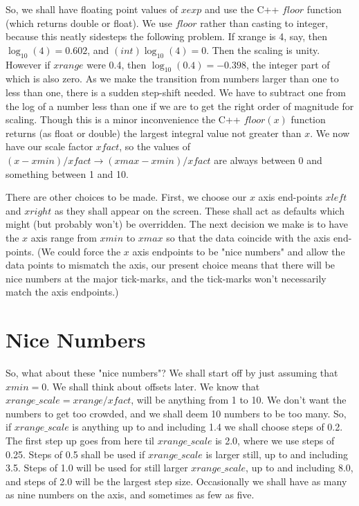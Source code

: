 \documentclass[12pt]{article}
\begin{document}
So, we shall have floating point values of $xexp$ and use the C++ $floor$
function (which returns double or float). We use $floor$ rather than casting 
to integer, because this neatly sidesteps the following
problem. If xrange is 4, say, then $\log_{10}(4)=0.602$,
and $(int)\log_{10}(4)=0$. Then  the scaling is unity. However if $xrange$ were
0.4, then $\log_{10}(0.4)=-0.398$, the integer part of which is also zero. As we
make the transition from numbers larger than one to less than one, there is a 
sudden step-shift needed. We have to subtract one from the log of a number
less than one if we are to get the
right order of magnitude for scaling. Though this is a minor inconvenience
 the C++ $floor(x)$ function returns (as float or double) the largest integral
value not greater than $x$. We now have our scale factor $xfact$, so
the values of $(x-xmin)/xfact \rightarrow (xmax-xmin)/xfact$
are always between 0 and something between 1 and 10.

There are other choices to be made. First, we choose our $x$ axis end-points
 $xleft$ and $xright$ as they shall appear on the screen. These shall
act as defaults which might (but probably won't) be overridden.
  The next decision we make is to have
the $x$ axis range from $xmin$ to $xmax$ so that the data coincide with the
axis end-points.  (We could force the $x$ axis endpoints to be "nice numbers"
 and allow the data points to mismatch the axis, our present choice means that
there will be nice numbers at the major tick-marks, and the tick-marks won't necessarily
match the axis endpoints.)

\section{Nice Numbers}

So, what about these "nice numbers"? We shall start off by just assuming that
$xmin=0$. We shall think about offsets later. We know that $xrange\_scale=xrange/xfact$, 
 will be anything from 1 to 10. We don't want the numbers to get too crowded, and
 we shall deem 10 numbers to be too many. So, if $xrange\_scale$ is anything
 up to and including 1.4
 we shall choose steps of 0.2. The first step up goes from here
 til $xrange\_scale$ is 2.0, where we use steps of 0.25.
 Steps of 0.5 shall be used if $xrange\_scale$ is larger still, up to and including
 3.5. Steps of 1.0 will be used for still larger $xrange\_scale$, up to and including
 8.0, and steps of 2.0 will be the largest step size. Occasionally we shall have
 as many as nine numbers on the axis, and sometimes as few as five.
\end{document}
